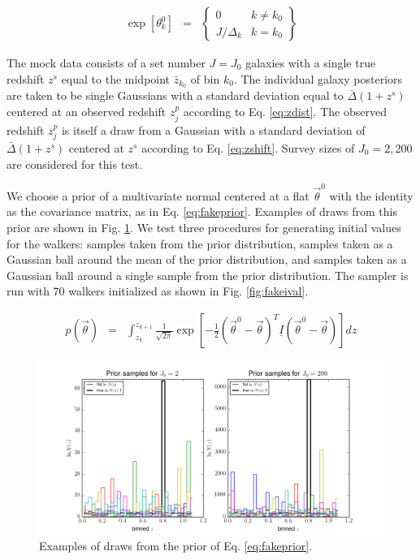 \documentclass[12pt, onecolumn]{emulateapj}
\newcommand{\textul}{\underline}
\begin{document}
\begin{eqnarray}
\label{eq:faketheta}
\exp[\theta_{k}^{0}] &=& \left\{\begin{array}{cc}0&k\neq k_{0}\\J/\Delta_{k}&k=k_{0}\end{array}\right\}
\end{eqnarray}

The mock data consists of a set number $J=J_{0}$ galaxies with a single true redshift $z^{s}$ equal to the midpoint $\bar{z}_{k_{0}}$ of bin $k_{0}$.  The individual galaxy posteriors are taken to be single Gaussians with a standard deviation equal to $\bar{\Delta}(1+z^{s})$ centered at an observed redshift $z^{p}_{j}$ according to Eq. \ref{eq:zdist}.  The observed redshift $z^{p}_{j}$ is itself a draw from a Gaussian with a standard deviation of $\bar{\Delta}(1+z^{s})$ centered at $z^{s}$ according to Eq. \ref{eq:zshift}.  Survey sizes of $J_{0}=2,200$ are considered for this test.

We choose a prior of a multivariate normal centered at a flat $\vec{\theta}^{0}$ with the identity as the covariance matrix, as in Eq. \ref{eq:fakeprior}.  Examples of draws from this prior are shown in Fig. \ref{fig:fakeprior}.  We test three procedures for generating initial values for the walkers: samples taken from the prior distribution, samples taken as a Gaussian ball around the mean of the prior distribution, and samples taken as a Gaussian ball around a single sample from the prior distribution.  The sampler is run with 70 walkers initialized as shown in Fig. \ref{fig:fakeival}.

\begin{eqnarray}
\label{eq:fakeprior}
p(\vec{\theta}) &=& \int_{z_{k}}^{z_{k+1}}\frac{1}{\sqrt{2\pi}}\exp[-\frac{1}{2}(\vec{\theta}^{0}-\vec{\theta})^{T}\textul{I}(\vec{\theta}^{0}-\vec{\theta})]dz
\end{eqnarray}

\begin{figure}
\label{fig:fakeprior}
\includegraphics[scale=0.25]{priorsamps.png}
\caption{Examples of draws from the prior of Eq. \ref{eq:fakeprior}.}
\end{figure}
\end{document}
